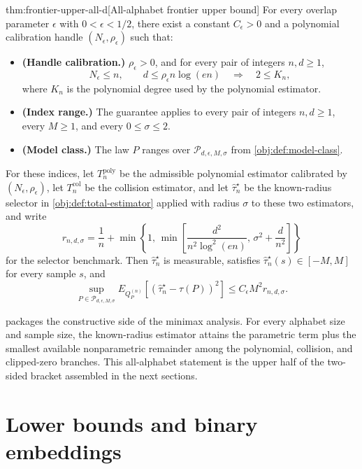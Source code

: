 \documentclass[11pt]{article}
\begin{document}
\begin{theoremv}{thm:frontier-upper-all-d}[All-alphabet frontier upper bound]
For every overlap parameter \(\epsilon\) with \(0<\epsilon<1/2\), there exist a constant \(C_{\epsilon}>0\) and a polynomial calibration handle \((N_{\epsilon},\rho_{\epsilon})\) such that:
\begin{itemize}
\item \textbf{(Handle calibration.)} \(\rho_{\epsilon}>0\), and for every pair of integers \(n,d\ge1\),
\[
N_{\epsilon}\le n,\qquad d\le \rho_{\epsilon} n\log(en)
\quad\Longrightarrow\quad
2\le K_n ,
\]
where \(K_n\) is the polynomial degree used by the polynomial estimator.
\item \textbf{(Index range.)} The guarantee applies to every pair of integers \(n,d\ge1\), every \(M\ge1\), and every \(0\le\sigma\le2\).
\item \textbf{(Model class.)} The law \(P\) ranges over \(\mathcal P_{d,\epsilon,M,\sigma}\) from \cref{obj:def:model-class}.
\end{itemize}
For these indices, let \(T_n^{\mathrm{poly}}\) be the admissible polynomial estimator calibrated by \((N_{\epsilon},\rho_{\epsilon})\), let \(T_n^{\mathrm{col}}\) be the collision estimator, and let \(\widehat\tau_n^{\star}\) be the known-radius selector in \cref{obj:def:total-estimator} applied with radius \(\sigma\) to these two estimators, and write
\[
r_{n,d,\sigma}
=
\frac{1}{n}
+
\min\left\{
1,\,
\min\left[
\frac{d^2}{n^2\log^2(en)},\,
\sigma^2+\frac{d}{n^2}
\right]
\right\}
\]
for the selector benchmark. Then \(\widehat\tau_n^{\star}\) is measurable, satisfies \(\widehat\tau_n^{\star}(s)\in[-M,M]\) for every sample \(s\), and
\[
\sup_{P\in\mathcal P_{d,\epsilon,M,\sigma}}
E_{Q_P^{(n)}}\!\left[\left(\widehat\tau_n^{\star}-\tau(P)\right)^2\right]
\le
C_{\epsilon}M^2 r_{n,d,\sigma}.
\]
\end{theoremv}

 packages the constructive side of the minimax analysis. For every alphabet size and sample size, the known-radius estimator attains the parametric term plus the smallest available nonparametric remainder among the polynomial, collision, and clipped-zero branches. This all-alphabet statement is the upper half of the two-sided bracket assembled in the next sections.


\section{Lower bounds and binary embeddings}
\end{document}

